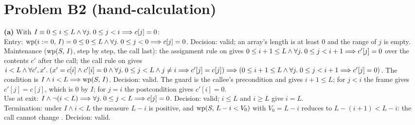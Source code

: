 \documentclass[11pt]{article}
\begin{document}
\section*{Problem B2 (hand-calculation)}\label{ans:B2}
\begin{answer}
\textbf{(a)} With $I \equiv 0 \leq i \leq L \wedge \forall j .\; 0 \leq j < i \Longrightarrow c[j] = 0$: \\
Entry: $\mathrm{wp}(i \mathrel{:=} 0,\,I) = 0 \leq 0 \leq L \wedge \forall j .\; 0 \leq j <
0 \Longrightarrow c[j] = 0$. \quad Decision: valid; an array's length is at least $0$
and the range of $j$ is empty. \\
Maintenance ($\mathrm{wp}(S,\,I)$, step by step, the call last): the assignment rule
on  gives $0 \leq i + 1 \leq L \wedge \forall j .\; 0 \leq j <
i + 1 \Longrightarrow c'[j] = 0$ over the contents $c'$ after the call; the call rule on
 gives
$i < L \wedge \forall c', x' .\; (x' = c[i] \wedge c'[i] = 0 \wedge \forall j
.\; 0 \leq j < L \wedge j \neq i \Longrightarrow c'[j] = c[j]) \Longrightarrow (0 \leq i + 1 \leq L
\wedge \forall j .\; 0 \leq j < i + 1 \Longrightarrow c'[j] = 0)$. The condition is
$I \wedge i < L \Longrightarrow \mathrm{wp}(S,\,I)$. \quad Decision: valid. The guard is the
callee's precondition and gives $i + 1 \leq L$; for $j < i$ the frame gives
$c'[j] = c[j]$, which is $0$ by $I$; for $j = i$ the postcondition gives
$c'[i] = 0$. \\
Use at exit: $I \wedge \neg(i < L) \Longrightarrow \forall j .\; 0 \leq j < L \Longrightarrow
c[j] = 0$. \quad Decision: valid; $i \leq L$ and $i \geq L$ give $i = L$. \\
Termination: under $I \wedge i < L$ the measure $L - i$ is positive, and
$\mathrm{wp}(S,\,L - i < V_0)$ with $V_0 = L - i$ reduces to $L - (i + 1) < L - i$:
the call cannot change . \quad Decision: valid.


\end{answer}
\end{document}
